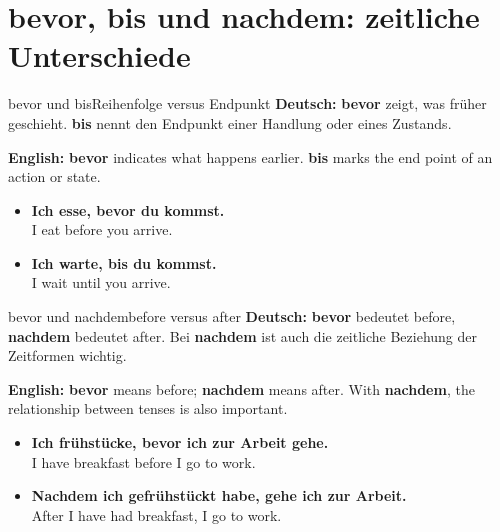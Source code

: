 \documentclass[a4paper,11pt]{article}
\newcommand{\GermanText}[1]{\textbf{Deutsch: }#1\par}
\newcommand{\EnglishText}[1]{{\small\color{SoftGray}\textbf{English: }#1\par}}
\newcommand{\ExampleItem}[2]{\item \textbf{#1}\\{\small\color{SoftGray}#2}}
\begin{document}
    \section{bevor, bis und nachdem: zeitliche Unterschiede}
        \begin{grammarentry}{bevor und bis}{Reihenfolge versus Endpunkt}
            \GermanText{\textbf{bevor} zeigt, was früher geschieht. \textbf{bis} nennt den Endpunkt einer Handlung oder eines Zustands.}
            \EnglishText{\textbf{bevor} indicates what happens earlier. \textbf{bis} marks the end point of an action or state.}
        \end{grammarentry}
        \begin{exbox}
            \begin{itemize}
                \ExampleItem{Ich esse, bevor du kommst.}{I eat before you arrive.}
                \ExampleItem{Ich warte, bis du kommst.}{I wait until you arrive.}
            \end{itemize}
        \end{exbox}
        \begin{grammarentry}{bevor und nachdem}{before versus after}
            \GermanText{\textbf{bevor} bedeutet \glqq before\grqq{}, \textbf{nachdem} bedeutet \glqq after\grqq{}. Bei \textbf{nachdem} ist auch die zeitliche Beziehung der Zeitformen wichtig.}
            \EnglishText{\textbf{bevor} means before; \textbf{nachdem} means after. With \textbf{nachdem}, the relationship between tenses is also important.}
        \end{grammarentry}
        \begin{exbox}
            \begin{itemize}
                \ExampleItem{Ich frühstücke, bevor ich zur Arbeit gehe.}{I have breakfast before I go to work.}
                \ExampleItem{Nachdem ich gefrühstückt habe, gehe ich zur Arbeit.}{After I have had breakfast, I go to work.}
            \end{itemize}
        \end{exbox}
\end{document}
